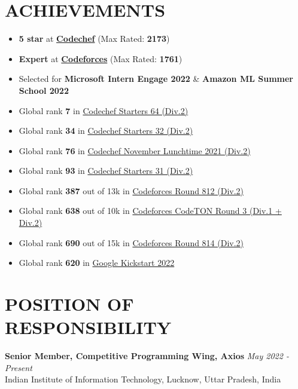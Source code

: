 \documentclass[12pt]{article}
\begin{document}
\section*{ACHIEVEMENTS}
\begin{itemize}[leftmargin=*, topsep=1pt, itemsep=1pt, partopsep=1pt, parsep=2pt]
	\item \textbf{5 star} at \href{https://www.codechef.com/users/prabhav7}{\textbf{Codechef}} (Max Rated: \textbf{2173})
	\item \textbf{Expert} at \href{https://codeforces.com/profile/prabhavagrawal7}{\textbf{Codeforces}} (Max Rated: \textbf{1761})
	\item Selected for \textbf{Microsoft Intern Engage 2022} \& \textbf{Amazon ML Summer School 2022}
	\item Global rank \textbf{7} in \href{https://www.codechef.com/rankings/START64B?search=prabhav7}{Codechef Starters 64 (Div.2)}
	\item Global rank \textbf{34} in \href{https://www.codechef.com/rankings/START32B?search=prabhav7}{Codechef Starters 32 (Div.2)}
	\item Global rank \textbf{76} in \href{https://www.codechef.com/rankings/LTIME102B?search=prabhav7}{Codechef November Lunchtime 2021 (Div.2)}
	\item Global rank \textbf{93} in \href{https://www.codechef.com/rankings/START31B?search=prabhav7}{Codechef Starters 31 (Div.2)}
	\item Global rank \textbf{387} out of 13k in \href{https://codeforces.com/contest/1713/standings/participant/137877142#p137877142}{Codeforces Round 812 (Div.2)}
	\item Global rank \textbf{638} out of 10k in \href{https://codeforces.com/contest/1750/standings/participant/143636092#p143636092}{Codeforces CodeTON Round 3 (Div.1 + Div.2)}
	\item Global rank \textbf{690} out of 15k in \href{https://codeforces.com/contest/1719/standings/participant/138512906#p138512906}{Codeforces Round 814 (Div.2)}
	\item Global rank \textbf{620} in \href{https://codingcompetitions.withgoogle.com/kickstart/certificate/summary/00000000008caba4}{Google Kickstart 2022}
\end{itemize}

\section*{POSITION OF RESPONSIBILITY}
\textbf{Senior Member, Competitive Programming Wing, Axios} \hfill \textit{May 2022 - Present} \\
Indian Institute of Information Technology, Lucknow, Uttar Pradesh, India
\end{document}
